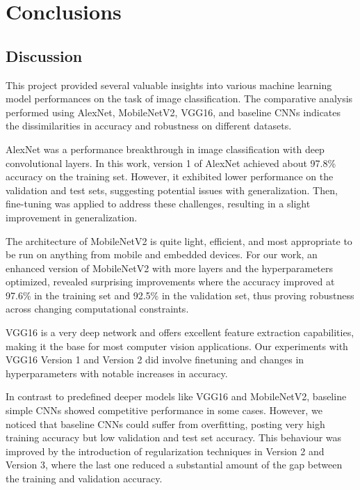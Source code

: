 \documentclass[conference]{IEEEtran}
\begin{document}
\section{Conclusions}


\subsection{Discussion}

This project provided several valuable insights into various machine learning model performances on the task of image classification. The comparative analysis performed using AlexNet, MobileNetV2, VGG16, and baseline CNNs indicates the dissimilarities in accuracy and robustness on different datasets.

AlexNet was a performance breakthrough in image classification with deep convolutional layers. In this work, version 1 of AlexNet achieved about 97.8\% accuracy on the training set. However, it exhibited lower performance on the validation and test sets, suggesting potential issues with generalization. Then, fine-tuning was applied to address these challenges, resulting in a slight improvement in generalization.

The architecture of MobileNetV2 is quite light, efficient, and most appropriate to be run on anything from mobile and embedded devices. For our work, an enhanced version of MobileNetV2 with more layers and the hyperparameters optimized, revealed surprising improvements where the accuracy improved at 97.6\% in the training set and 92.5\% in the validation set, thus proving robustness across changing computational constraints.

VGG16 is a very deep network and offers excellent feature extraction capabilities, making it the base for most computer vision applications. Our experiments with VGG16 Version 1 and Version 2 did involve finetuning and changes in hyperparameters with notable increases in accuracy.

In contrast to predefined deeper models like VGG16 and MobileNetV2, baseline simple CNNs showed competitive performance in some cases. However, we noticed that baseline CNNs could suffer from overfitting, posting very high training accuracy but low validation and test set accuracy. This behaviour was improved by the introduction of regularization techniques in Version 2 and Version 3, where the last one reduced a substantial amount of the gap between the training and validation accuracy.
\end{document}
